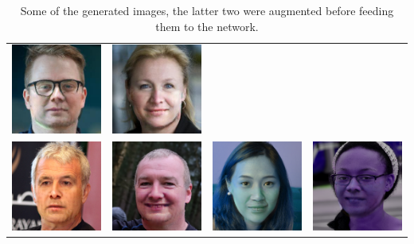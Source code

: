 \documentclass[10pt,twocolumn,letterpaper]{article}
\begin{document}
\begin{table}
\begin{tabular}{cccc}
    \includegraphics[width=.2\linewidth]{samples/00353.jpg}&
    \includegraphics[width=.2\linewidth]{samples/00708.jpg}\\
    \includegraphics[width=.2\linewidth]{samples/recon_600.png}&
    \includegraphics[width=.2\linewidth]{samples/recon_900.png}&
    \includegraphics[width=.2\linewidth]{samples/aug_recon_1600.png}&
    \includegraphics[width=.2\linewidth]{samples/aug_recon_200.png}\\
\end{tabular}
  \label{tab:photos}
  \caption{Some of the generated images, the latter two were augmented before
  feeding them to the network.}
\end{table}
\end{document}
